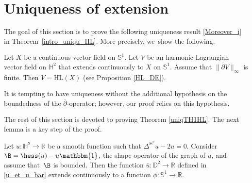 \section{Uniqueness of extension}\label{sec_uniquness}
The goal of this section is to prove the following uniqueness result \eqref{Moreover_i} in Theorem~\ref{intro_uniqu_HL}. More precisely, we~show the following.

\begin{theorem}\label{uniqTH1HL}
Let $X$ be a continuous vector field on $\mathbb{S}^1$. Let $V$ be an harmonic Lagrangian vector field on $\mathbb{H}^2$ that extends continuously to $X$ on $\mathbb{S}^1$. Assume that $\lVert \overline{\partial}V\rVert_{\infty}$ is finite. Then $V=\mathrm{HL}(X)$ (see Proposition \ref{HL_DE}).
\end{theorem}
It is tempting to have uniqueness without the additional hypothesis on the boundedness of the $\overline{\partial}$-operator; however, our proof relies on this hypothesis.

The rest of this section is devoted to proving Theorem \ref{uniqTH1HL}. The next lemma is a key step of the proof.

\begin{prop}\label{zygumund_imply_extension}
Let \(u: \mathbb{H}^2 \to \mathbb{R} \) be a smooth function such that \(\Delta^{\mathbb{H}^2} u - 2u = 0 \). Consider \(\B = \hess(u) - u \mathbbm{1} \), the shape operator of the graph of \(u \), and assume that~\(\B \) is bounded. Then the function \(\overline{u}: \mathbb{D}^2 \to \mathbb{R} \) defined in \eqref{u_et_u_bar} extends continuously to a function \(\phi: \mathbb{S}^1 \to \mathbb{R} \).
\end{prop}

